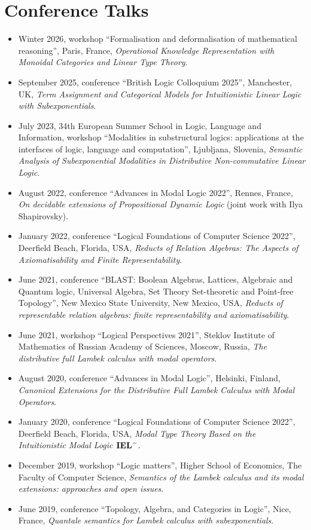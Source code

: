 \documentclass[11pt,a4paper]{article}
\begin{document}
\section{Conference Talks}

\begin{itemize}[leftmargin=*]
    \item Winter 2026, workshop ``Formalisation and deformalisation of mathematical reasoning'', Paris, France, \emph{Operational Knowledge Representation with Monoidal Categories and Linear Type Theory}.
    \item September 2025, conference ``British Logic Colloquium 2025'', Manchester, UK, \textit{Term Assignment and Categorical Models for Intuitionistic Linear Logic with Subexponentials}.
    \item July 2023, 34th European Summer School in Logic, Language and Information, workshop ``Modalities in substructural logics: applications at the interfaces of logic, language and computation'', Ljubljana, Slovenia, \textit{Semantic Analysis of Subexponential Modalities in Distributive Non-commutative Linear Logic}.
    \item August 2022, conference ``Advances in Modal Logic 2022'', Rennes, France, \textit{On decidable extensions of Propositional Dynamic Logic} (joint work with Ilya Shapirovsky).
    \item January 2022, conference ``Logical Foundations of Computer Science 2022'', Deerfield Beach, Florida, USA, \textit{Reducts of Relation Algebras: The Aspects of Axiomatisability and Finite Representability}.
    \item June 2021, conference ``BLAST: Boolean Algebras, Lattices, Algebraic and Quantum logic, Universal Algebra, Set Theory Set-theoretic and Point-free Topology'', New Mexico State University, New Mexico, USA, \textit{Reducts of representable relation algebras: finite representability and axiomatisability}.
    \item June 2021, workshop ``Logical Perspectives 2021'', Steklov Institute of Mathematics of Russian Academy of Sciences, Moscow, Russia, \textit{The distributive full Lambek calculus with modal operators}.
    \item August 2020, conference ``Advances in Modal Logic'', Helsinki, Finland, \textit{Canonical Extensions for the Distributive Full Lambek Calculus with Modal Operators}.
    \item January 2020, conference ``Logical Foundations of Computer Science 2022'', Deerfield Beach, Florida, USA, \textit{Modal Type Theory Based on the Intuitionistic Modal Logic ${\bf IEL}^{-}$}.
    \item December 2019, workshop ``Logic matters'', Higher School of Economics, The Faculty of Computer Science, \textit{Semantics of the Lambek calculus and its modal extensions: approaches and open issues}.
    \item June 2019, conference ``Topology, Algebra, and Categories in Logic'', Nice, France, \textit{Quantale semantics for Lambek calculus with subexponentials}.
\end{itemize}
\end{document}
